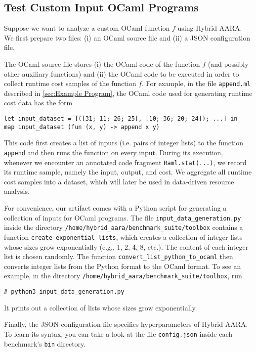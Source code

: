 \subsection{Test Custom Input OCaml Programs}

Suppose we want to analyze a custom OCaml function $f$ using Hybrid AARA.
%
We first prepare two files: (i) an OCaml source file and (ii) a JSON
configuration file.

The OCaml source file stores (i) the OCaml code of the function $f$ (and
possibly other auxiliary functions) and (ii) the OCaml code to be executed in
order to collect runtime cost samples of the function $f$.
%
For example, in the file \texttt{append.ml} described in \cref{sec:Example
  Program}, the OCaml code used for generating runtime cost data has the form
\begin{verbatim}
let input_dataset = [([31; 11; 26; 25], [10; 36; 20; 24]); ...] in
map input_dataset (fun (x, y) -> append x y)
\end{verbatim}
%
This code first creates a list of inputs (i.e. pairs of integer lists) to the
function \texttt{append} and then runs the function on every input.
%
During its execution, whenever we encounter an annotated code fragment
\texttt{Raml.stat(...)}, we record its runtime sample, namely the input, output,
and cost.
%
We aggregate all runtime cost samples into a dataset, which will later be used
in data-driven resource analysis.

For convenience, our artifact comes with a Python script for generating a
collection of inputs for OCaml programs.
%
The file \texttt{input\_data\_generation.py} inside the directory
\texttt{/home/hybrid\_aara/benchmark\_suite/toolbox}
contains a function \texttt{create\_exponential\_lists}, which creates a
collection of integer lists whose sizes grow exponentially (e.g., 1, 2, 4, 8,
etc.).
%
The content of each integer list is chosen randomly.
%
The function \texttt{convert\_list\_python\_to\_ocaml} then converts integer
lists from the Python format to the OCaml format.
%
To see an example, in the directory
\texttt{/home/hybrid\_aara/benchmark\_suite/toolbox}, run
\begin{verbatim}
# python3 input_data_generation.py
\end{verbatim}
%
It prints out a collection of lists whose sizes grow exponentially.

Finally, the JSON configuration file specifies hyperparameters of Hybrid AARA.
%
To learn its syntax, you can take a look at the file \texttt{config.json} inside
each benchmark's \texttt{bin} directory.

